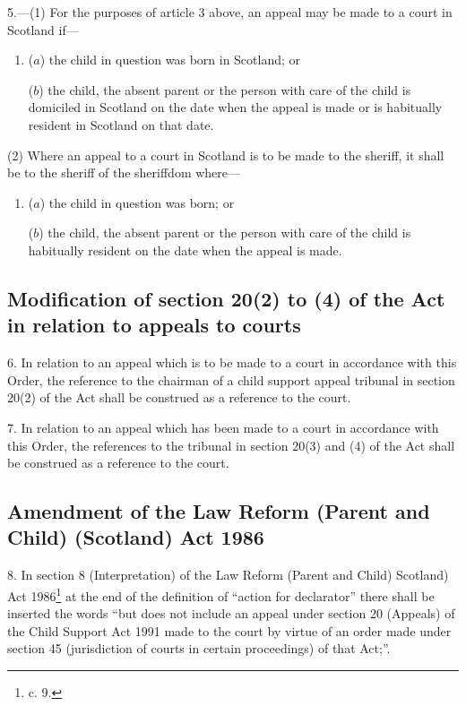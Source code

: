 \documentclass[a4paper]{article}
\begin{document}
\medskip

5.—(1) For the purposes of article 3 above, an appeal may be made to a court in Scotland if—
\begin{enumerate}\item[]
($a$) the child in question was born in Scotland; or

($b$) the child, the absent parent or the person with care of the child is domiciled in Scotland on the date when the appeal is made or is habitually resident in Scotland on that date.
\end{enumerate}

(2) Where an appeal to a court in Scotland is to be made to the sheriff, it shall be to the sheriff of the sheriffdom where—
\begin{enumerate}\item[]
($a$) the child in question was born; or

($b$) the child, the absent parent or the person with care of the child is habitually resident on the date when the appeal is made.
\end{enumerate}

\subsection[6, 7. Modification of section 20(2) to (4) of the Act in relation to appeals to courts]{Modification of section 20(2) to (4) of the Act in relation to appeals to courts}

6.  In relation to an appeal which is to be made to a court in accordance with this Order, the reference to the chairman of a child support appeal tribunal in section 20(2) of the Act shall be construed as a reference to the court. 

\medskip

7.  In relation to an appeal which has been made to a court in accordance with this Order, the references to the tribunal in section 20(3) and (4) of the Act shall be construed as a reference to the court.

\subsection[8. Amendment of the Law Reform (Parent and Child) (Scotland) Act 1986]{Amendment of the Law Reform (Parent and Child) (Scotland) Act 1986}

8.  In section 8 (Interpretation) of the Law Reform (Parent and Child) Scotland) Act 1986\footnote{ c. 9.} at the end of the definition of “action for declarator” there shall be inserted the words “but does not include an appeal under section 20 (Appeals) of the Child Support Act 1991 made to the court by virtue of an order made under section 45 (jurisdiction of courts in certain proceedings) of that Act;”.
\end{document}
